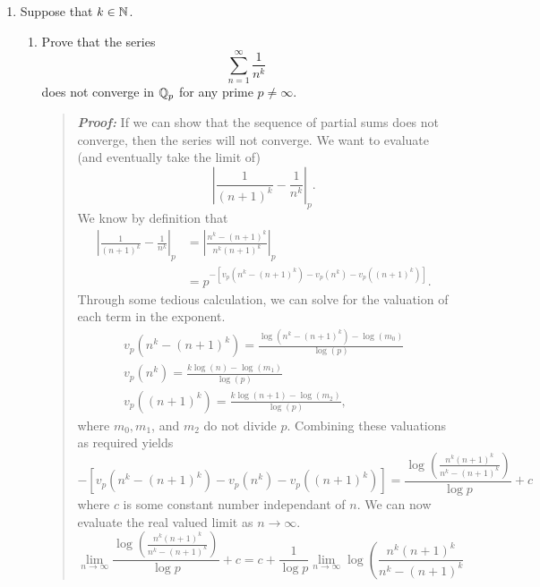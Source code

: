 \documentclass{hw}
\begin{document}
\begin{enumerate}
	\item Suppose that $k\in\mathbb{N}$.
	      \begin{enumerate}
	      	\item Prove that the series
	      	      \[
	      	      	\sum_{n=1}^{\infty}\frac{1}{n^{k}}
	      	      \]
	      	      does not converge in $\mathbb{Q}_{p}$ for any prime $p\neq\infty$.
	      	      \begin{quote}
	      	      	\textit{\textbf{Proof:}} If we can show that the sequence of partial sums does not converge, then the series will not converge. We want to evaluate (and eventually take the limit of)
	      	      	\[
	      	      		\left|
	      	      		\frac{1}{(n+1)^{k}}-\frac{1}{n^{k}}
	      	      		\right|_{p}.
	      	      	\]
	      	      	We know by definition that
	      	      	\begin{align*}
	      	      		\left|
	      	      		\frac{1}{(n+1)^{k}}-\frac{1}{n^{k}}
	      	      		\right|_{p} &=
						\left|
							\frac{n^{k}-(n+1)^{k}}{n^{k}(n+1)^{k}}
						\right|_{p}\\
	      	      		&= p^{-
	      	      			\left[
	      	      			v_{p}(n^{k}-(n+1)^{k}) - v_{p}(n^{k})-v_{p}((n+1)^{k})
	      	      			\right]
	      	      		}.
	      	      	\end{align*}
					Through some tedious calculation, we can solve for the valuation of each term in the exponent.
					\begin{gather*}
						v_{p}\left(n^k-(n+1)^k\right) =
						\frac{
							\log{(n^k-(n+1)^k) - \log(m_{0})}
						}{
							\log{(p)}
						}\\
						v_{p}(n^{k}) =
						\frac{
							k\log{(n)}-\log{(m_{1})}
						}{\log{(p)}}\\
						v_{p}((n+1)^k) =
						\frac{
							k\log{(n+1)}-\log{(m_{2})}
						}{
							\log{(p)}
						},
					\end{gather*}
					where $m_{0},m_{1}$, and $m_{2}$ do not divide $p$. Combining these valuations as required yields
					\[
					-\left[v_{p}(n^{k}-(n+1)^{k}) - v_{p}(n^{k})-v_{p}((n+1)^{k})\right]=
					\frac{
					\log{\left(
						\frac{n^{k}(n+1)^{k}}{n^k-(n+1)^k}
					\right)}
					}{
						\log{p}
					} + c
					\]
					where $c$ is some constant number independant of $n$. We can now evaluate the real valued limit as $n\to\infty$.
					\[
						\lim_{n\to\infty}\frac{
						\log{\left(
							\frac{n^{k}(n+1)^{k}}{n^k-(n+1)^k}
						\right)}}{\log{p}} + c = c+\frac{1}{\log{p}}\lim_{n\to\infty}\log{\left(
							\frac{n^{k}(n+1)^{k}}{n^k-(n+1)^k}
}\]
\end{quote}
\end{enumerate}
\end{enumerate}
\end{document}
